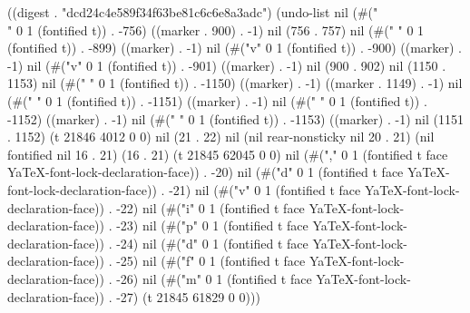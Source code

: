 
((digest . "dcd24c4e589f34f63be81c6c6e8a3adc") (undo-list nil (#("\\" 0 1 (fontified t)) . -756) ((marker . 900) . -1) nil (756 . 757) nil (#("
" 0 1 (fontified t)) . -899) ((marker) . -1) nil (#("v" 0 1 (fontified t)) . -900) ((marker) . -1) nil (#("v" 0 1 (fontified t)) . -901) ((marker) . -1) nil (900 . 902) nil (1150 . 1153) nil (#("
" 0 1 (fontified t)) . -1150) ((marker) . -1) ((marker . 1149) . -1) nil (#("
" 0 1 (fontified t)) . -1151) ((marker) . -1) nil (#(" " 0 1 (fontified t)) . -1152) ((marker) . -1) nil (#(" " 0 1 (fontified t)) . -1153) ((marker) . -1) nil (1151 . 1152) (t 21846 4012 0 0) nil (21 . 22) nil (nil rear-nonsticky nil 20 . 21) (nil fontified nil 16 . 21) (16 . 21) (t 21845 62045 0 0) nil (#("," 0 1 (fontified t face YaTeX-font-lock-declaration-face)) . -20) nil (#("d" 0 1 (fontified t face YaTeX-font-lock-declaration-face)) . -21) nil (#("v" 0 1 (fontified t face YaTeX-font-lock-declaration-face)) . -22) nil (#("i" 0 1 (fontified t face YaTeX-font-lock-declaration-face)) . -23) nil (#("p" 0 1 (fontified t face YaTeX-font-lock-declaration-face)) . -24) nil (#("d" 0 1 (fontified t face YaTeX-font-lock-declaration-face)) . -25) nil (#("f" 0 1 (fontified t face YaTeX-font-lock-declaration-face)) . -26) nil (#("m" 0 1 (fontified t face YaTeX-font-lock-declaration-face)) . -27) (t 21845 61829 0 0)))
